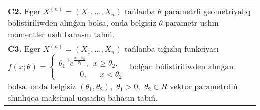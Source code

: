\documentclass{article}
\begin{document}
\begin{tabular}{m{17cm}}
 \\
\textbf{C2.} 
Eger \(X^{(n)} = \left( X_{1},...,X_{n} \right)\) tańlanba \(\theta\) parametrli geometriyalıq bólistiriliwden alınǵan bolsa, onda belgisiz \(\theta\) parametr ushın momentler usılı bahasın tabıń.
 \\
\textbf{C3.} 
Eger \(X^{(n)} = \left( X_{1},...,X_{n} \right)\) tańlanba tıǵızlıq funkciyası
$f(x;\theta) = \left\{ \begin{matrix}
\theta_{1}^{- 1}e^{\frac{x - \theta_{2}}{\theta_{1}}},\ \ x \geq \theta_{2}, \\
\ \ \ \ \ \ \ \ \ \ \ \ 0,\ \ \ \ \ \ \ x < \theta_{2}
\end{matrix} \right.\ $
bolǵan bólistiriliwden alınǵan bolsa, onda belgisiz \(\left( \theta_{1},\theta_{2} \right),\) \(\theta_{1} > 0,\) \(\theta_{2} \in R\) vektor parametrdiń shınlıqqa maksimal uqsaslıq bahasın tabıń.
 \\

\end{tabular}
\vspace{1cm}
\end{document}
